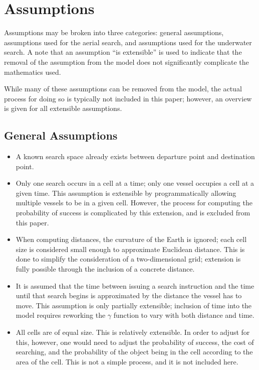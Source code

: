 \section{Assumptions}

Assumptions may be broken into three categories: general assumptions, assumptions used for the aerial search, and assumptions used for the underwater search. A note that an assumption ``is extensible'' is used to indicate that the removal of the assumption from the model does not significantly complicate the mathematics used.

While many of these assumptions can be removed from the model, the actual process for doing so is typically not included in this paper; however, an overview is given for all extensible assumptions.

\subsection{General Assumptions}

\begin{itemize}
\item A known search space already exists between departure point and destination point.
\item Only one search occurs in a cell at a time; only one vessel occupies a cell at a given time. This assumption is extensible by programmatically allowing multiple vessels to be in a given cell. However, the process for computing the probability of success is complicated by this extension, and is excluded from this paper.
\item When computing distances, the curvature of the Earth is ignored; each cell size is considered small enough to approximate Euclidean distance. This is done to simplify the consideration of a two-dimensional grid; extension is fully possible through the inclusion of a concrete distance.
  
\item It is assumed that the time between issuing a search instruction and the time until that search begins is approximated by the distance the vessel has to move. This assumption is only partially extensible; inclusion of time into the model requires reworking the $\gamma$ function to vary with both distance and time.
\item All cells are of equal size. This is relatively extensible. In order to adjust for this, however, one would need to adjust the probability of success, the cost of searching, and the probability of the object being in the cell according to the area of the cell. This is not a simple process, and it is not included here.
\end{itemize}

